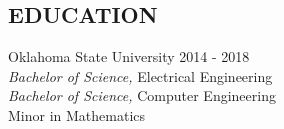 \documentclass[line,margin]{res}
\begin{document}
\begin{resume}
\section{EDUCATION} Oklahoma State University \hfill 2014 - 2018 \\
                        {\sl Bachelor of Science,} Electrical Engineering \\
                        {\sl Bachelor of Science,} Computer Engineering \\
                        Minor in Mathematics 



\end{resume}
\end{document}

